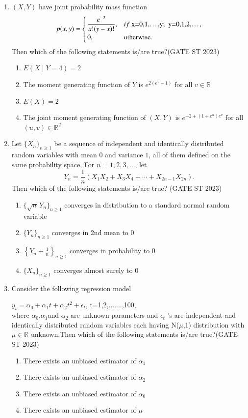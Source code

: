 \documentclass[journal]{IEEEtran}
\begin{document}
\begin{enumerate}[label=\textbf{Q.\arabic*.}, start=11, align=left, itemsep=2em]
\item $(X,Y)$ have joint probability mass function
\[
p(x,y) = \begin{cases}
\dfrac{e^{-2}}{x! (y-x)!}, & if$ x=0,1,\dots,y;~ y=0,1,2,\dots,$ \\
0, & \text{otherwise}.
\end{cases}
\]
Then which of the following statements is/are true?\hfill(GATE ST 2023)
\begin{enumerate}
\item $E(X \mid Y=4) = 2$
\item The moment generating function of $Y$ is $e^{2(e^v - 1)}$ for all $v \in \mathbb{R}$
\item $E(X) = 2$
\item The joint moment generating function of $(X,Y)$ is $e^{-2 + (1 + e^u) e^v}$ for all $(u,v)\in \mathbb{R}^2$
\end{enumerate}

\item Let $\{X_n\}_{n \ge 1}$ be a sequence of independent and identically distributed random 
variables with mean $0$ and variance $1$, all of them defined on the same 
probability space. For $n = 1, 2, 3, \dots$, let  
\[
Y_n = \frac{1}{n} \left( X_1 X_2 + X_3 X_4 + \cdots + X_{2n-1} X_{2n} \right).
\]
Then which of the following statements is/are true? \hfill(GATE ST 2023) 

\begin{enumerate}
    \item $\{\sqrt{n} \, Y_n\}_{n \ge 1}$ converges in distribution to a standard normal random variable
    \item $\{Y_n\}_{n \ge 1}$ converges in 2nd mean to $0$
    \item $\left\{ Y_n + \frac{1}{n} \right\}_{n \ge 1}$ converges in probability to $0$
    \item $\{X_n\}_{n \ge 1}$ converges almost surely to $0$
\end{enumerate}


\item Consider the following regression model 

$y_t = \alpha_0 + \alpha_1 t + \alpha_2 t^2 + \epsilon_t$,      t=1,2,.......,100, \\

where $\alpha_0$,$\alpha_1$and $\alpha_2$ are unknown parameters and $\epsilon_t$ 's are independent and identically distributed random variables each having N($\mu$,1) distribution with $\mu \in \mathbb{R}$ unknown.Then which of the following statements is/are true?\hfill(GATE ST 2023)
\begin{enumerate}
\item There exists an unbiased estimator of $\alpha_1$
\item There exists an unbiased estimator of $\alpha_2$
\item There exists an unbiased estimator of $\alpha_0$
\item There exists an unbiased estimator of $\mu$
\end{enumerate}


\end{enumerate}
\end{document}

